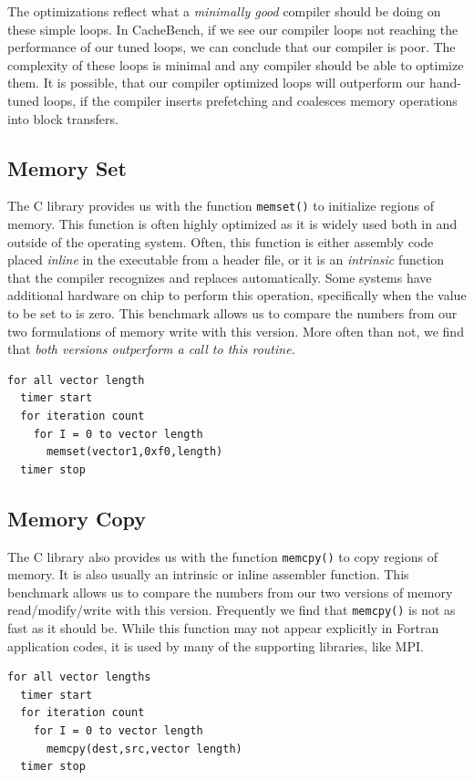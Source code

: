 \documentclass [12pt]{article}
\begin{document}
The optimizations reflect what a {\em minimally good} compiler should be doing
on these simple loops. In CacheBench, if we see our compiler loops not
reaching the performance of our tuned loops, we can conclude that our
compiler is poor. The complexity of these loops is minimal and any 
compiler should be able to optimize them. It is possible, that our
compiler optimized loops will outperform our hand-tuned loops, if the
compiler inserts prefetching and coalesces memory operations into
block transfers.

\subsection{Memory Set}

The C library provides us with the function {\tt memset()} to
initialize regions of memory. This function is often highly optimized
as it is widely used both in and outside of the operating
system. Often, this function is either assembly code placed {\em
inline} in the executable from a header file, or it is an {\em
intrinsic} function that the compiler recognizes and replaces
automatically. Some systems have additional hardware on chip to
perform this operation, specifically when the value to be set to is
zero. This benchmark allows us to compare the numbers from our two
formulations of memory write with this version. More often than not, we
find that {\em both versions outperform a call to this routine.}

\begin{verbatim}
for all vector length
  timer start
  for iteration count
    for I = 0 to vector length
      memset(vector1,0xf0,length)
  timer stop
\end{verbatim}

\subsection{Memory Copy}

The C library also provides us with the function {\tt memcpy()} to
copy regions of memory. It is also usually an intrinsic or inline 
assembler function. This benchmark allows us to compare the numbers
from our two versions of memory read/modify/write with this version.
Frequently we find that {\tt memcpy()} is not as fast as it should be.
While this function may not appear explicitly in Fortran application
codes, it is used by many of the supporting libraries, like MPI.

\begin{verbatim}
for all vector lengths
  timer start
  for iteration count
    for I = 0 to vector length
      memcpy(dest,src,vector length)
  timer stop
\end{verbatim}
\end{document}
